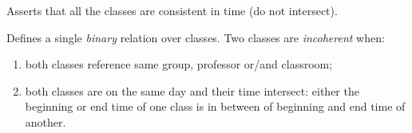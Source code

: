 \documentclass[../ThesisDoc]{subfiles}
\begin{document}
Asserts that all the classes are consistent in time (do not intersect).

Defines a single \emph{binary} relation over classes.
Two classes are \emph{incoherent} when:
\begin{enumerate}
  \item both classes reference same group, professor or/and classroom;
  \item both classes are on the same day and their time intersect:
          either the beginning or end time of one class is in between of
          beginning and end time of another.
\end{enumerate}

\begin{center}
  
\end{center}
\end{document}
